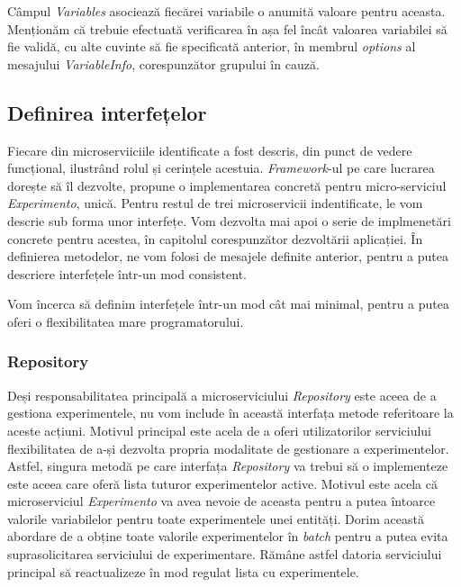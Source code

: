 Câmpul \textit{Variables} asociează fiecărei variabile o anumită valoare pentru aceasta. Menționăm că trebuie efectuată verificarea în așa fel încât valoarea variabilei să fie validă, cu alte cuvinte să fie specificată anterior, în membrul \textit{options} al mesajului \textit{VariableInfo}, corespunzător grupului în cauză.

\break

\subsection{Definirea interfețelor}

Fiecare din microserviiciile identificate a fost descris, din punct de vedere funcțional, ilustrând rolul și cerințele acestuia. \textit{Framework}-ul pe care lucrarea dorește să îl dezvolte, propune o implementarea concretă pentru micro-serviciul \textit{Experimento}, unică. Pentru restul de trei microservicii indentificate, le vom descrie sub forma unor interfețe. Vom dezvolta mai apoi o serie de implmenetări concrete pentru acestea, în capitolul corespunzător dezvoltării aplicației. În definierea metodelor, ne vom folosi de mesajele definite anterior, pentru a putea descriere interfețele într-un mod consistent.

\begin{remark}
	Vom încerca să definim interfețele într-un mod cât mai minimal, pentru a putea oferi o flexibilitatea mare programatorului.
\end{remark}

\subsubsection{Repository}

Deși responsabilitatea principală a microserviciului \textit{Repository} este aceea de a gestiona experimentele, nu vom include în această interfața metode referitoare la aceste acțiuni. Motivul principal este acela de a oferi utilizatorilor serviciului flexibilitatea de a-și dezvolta propria modalitate de gestionare a experimentelor. Astfel, singura metodă pe care interfața \textit{Repository} va trebui să o implementeze este aceea care oferă lista tuturor experimentelor active. Motivul este acela că microserviciul \textit{Experimento} va avea nevoie de aceasta pentru a putea întoarce valorile variabilelor pentru toate experimentele unei entități. Dorim această abordare de a obține toate valorile experimentelor în \textit{batch} pentru a putea evita suprasolicitarea serviciului de experimentare. Rămâne astfel datoria serviciului principal să reactualizeze în mod regulat lista cu experimentele.

